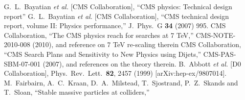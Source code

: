 \documentclass{PoS}
\begin{document}
\begin{thebibliography}{0}
  G.~L.~Bayatian {\it et al.}  [CMS Collaboration],
  ``CMS physics: Technical design report''
 \quad
 G.~L.~Bayatian {\it et al.}  [CMS Collaboration],
 ``CMS technical design report, volume II: Physics performance,''
 J.\ Phys.\ G {\bf 34} (2007) 995.
  CMS Collaboration,
  ``The CMS physics reach for searches at 7 TeV,''
  CMS-NOTE-2010-008 (2010), and reference on 7 TeV re-scaling therein
 CMS Collaboration,
 ``CMS Search Plans and Sensitivity to New Physics using Dijets,''
 CMS-PAS-SBM-07-001 (2007), and references on the theory therein.
  B.~Abbott {\it et al.}  [D0 Collaboration],
  Phys.\ Rev.\ Lett.\  {\bf 82}, 2457 (1999)
  [arXiv:hep-ex/9807014].
  M.~Fairbairn, A.~C.~Kraan, D.~A.~Milstead, T.~Sjostrand, P.~Z.~Skands and T.~Sloan,
  ``Stable massive particles at colliders,''

\end{thebibliography}
\end{document}
